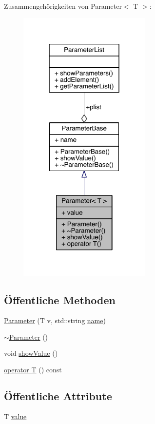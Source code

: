 Zusammengehörigkeiten von Parameter$<$ T $>$\+:\nopagebreak
\begin{figure}[H]
\begin{center}
\leavevmode
\includegraphics[width=187pt]{class_parameter__coll__graph}
\end{center}
\end{figure}
\subsection*{Öffentliche Methoden}
\begin{DoxyCompactItemize}
\item 
\hyperlink{class_parameter_a0043f636d495e3cd40686c35b0108059}{Parameter} (T v, std\+::string \hyperlink{class_parameter_base_a3e2e2ad34b89eabb0484b3a338133614}{name})
\item 
\hyperlink{class_parameter_a66e9872be5c4d3b49007c5be61ec5620}{$\sim$\+Parameter} ()
\item 
void \hyperlink{class_parameter_ab0091864db90216ee76ee9084422b380}{show\+Value} ()
\item 
\hyperlink{class_parameter_acd26e6a88234a14e642bfbcc8e3f5968}{operator T} () const
\end{DoxyCompactItemize}
\subsection*{Öffentliche Attribute}
\begin{DoxyCompactItemize}
\item 
T \hyperlink{class_parameter_a5dcbb3f478f204d7931eec2b3ed66117}{value}
\end{DoxyCompactItemize}


